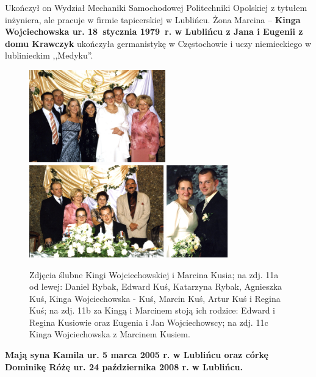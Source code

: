 Ukończył on Wydział Mechaniki Samochodowej Politechniki Opolskiej z tytułem inżyniera, ale pracuje w firmie tapicerskiej w Lublińcu. Żona Marcina -- \textbf{Kinga Wojciechowska ur. 18~stycznia 1979~r. w Lublińcu z Jana i Eugenii z domu Krawczyk} ukończyła germanistykę w Częstochowie i uczy niemieckiego w lublinieckim ,,Medyku''.
\begin{figure}[!h]
\begin{center}
\includegraphics[height=40mm]{photo/marcin_kinga_kus_slub_2.jpg}
\includegraphics[height=40mm]{photo/marcin_kinga_kus_slub_3.jpg}
\includegraphics[height=40mm]{photo/marcin_kinga_kus_slub_1.jpg}
\caption[Zdjęcia ślubne Kingi Wojciechowskiej i Marcina Kusia]{Zdjęcia ślubne Kingi Wojciechowskiej i Marcina Kusia; na zdj. 11a od lewej: Daniel Rybak, Edward Kuś, Katarzyna Rybak, Agnieszka Kuś, Kinga Wojciechowska - Kuś, Marcin Kuś, Artur Kuś i Regina Kuś; na zdj. 11b za Kingą i Marcinem stoją ich rodzice: Edward i Regina Kusiowie oraz Eugenia i Jan Wojciechowscy; na zdj. 11c Kinga Wojciechowska z Marcinem Kusiem.}
\label{rys:marcin_kinga_kus_slub}
\end{center}
\end{figure}

\textbf{Mają syna Kamila ur. 5 marca 2005 r. w Lublińcu oraz córkę Dominikę Różę ur. 24 października 2008 r. w Lublińcu.}

